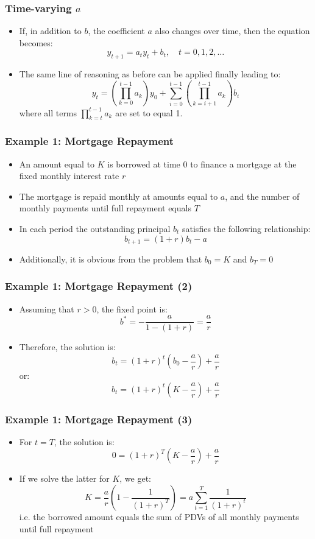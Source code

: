 \documentclass[10pt,usenames,dvipsnames]{beamer}
\theoremstyle{plain}
\theoremstyle{definition}
\begin{document}
\begin{frame}[fragile]
\frametitle{Time-varying $a$}
\begin{itemize}
	\item If, in addition to $b$, the coefficient $a$ also changes over time, then the equation becomes:
	\[
		y_{t+1} = a_{t}y_{t} + b_{t}, \quad t = 0,1,2,\ldots
	\]
	\item The same line of reasoning as before can be applied finally leading to:
	\[
		y_{t} = \left(\prod_{k=0}^{t-1}a_{k}\right)y_{0} + \sum_{i=0}^{t-1}\left(\prod_{k=i+1}^{t-1}a_{k}\right)b_{i}
	\]
	where all terms $\displaystyle \prod_{k=t}^{t-1}a_{k}$ are set to equal 1.
\end{itemize}
\end{frame}

\begin{frame}[fragile]
\frametitle{Example 1: Mortgage Repayment}
\begin{itemize}
	\item An amount equal to $K$ is borrowed at time 0 to finance a mortgage at the fixed monthly interest rate $r$
	\item The mortgage is repaid monthly at amounts equal to $a$, and the number of monthly payments until full repayment equals $T$
	\item In each period the outstanding principal $b_{t}$ satisfies the following relationship:
	\[
		b_{t+1} = (1+r)b_{t} - a
	\]
	\item Additionally, it is obvious from the problem that $b_{0} = K$ and $b_{T} = 0$ 
\end{itemize}
\end{frame}

\begin{frame}[fragile]
\frametitle{Example 1: Mortgage Repayment (2)}
\begin{itemize}
	\item Assuming that $r > 0$, the fixed point is:
	\[
		b^{*} = -\frac{a}{1 - (1+r)} = \frac{a}{r}
	\]
	\item Therefore, the solution is:
	\[
		b_{t} = (1+r)^{t}\left(b_{0} - \frac{a}{r}\right) + \frac{a}{r}
	\]
	or:
	\[
		b_{t} = (1+r)^{t}\left(K - \frac{a}{r}\right) + \frac{a}{r}
	\]
\end{itemize}
\end{frame}

\begin{frame}[fragile]
\frametitle{Example 1: Mortgage Repayment (3)}
\begin{itemize}
	\item For $t=T$, the solution is:
	\[
		0 = (1+r)^{T}\left(K - \frac{a}{r}\right) + \frac{a}{r}
	\]
	\item If we solve the latter for $K$, we get:
	\[
		K = \frac{a}{r}\left(1 - \frac{1}{(1+r)^{T}}\right) = a\sum_{t=1}^{T}\frac{1}{(1+r)^{t}}
	\]
	i.e. the borrowed amount equals the sum of PDVs of all monthly payments until full repayment
\end{itemize}
\end{frame}
\end{document}
